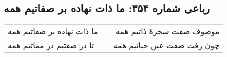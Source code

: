 \begin{center}
\section*{رباعی شماره ۳۵۴: ما ذات نهاده بر صفاتیم همه}
\label{sec:sh354}
\begin{longtable}{l p{0.5cm} r}
ما ذات نهاده بر صفاتیم همه
&&
موصوف صفت سخرهٔ ذاتیم همه
\\
تا در صفتیم در مماتیم همه
&&
چون رفت صفت عین حیاتیم همه
\\
\end{longtable}
\end{center}
